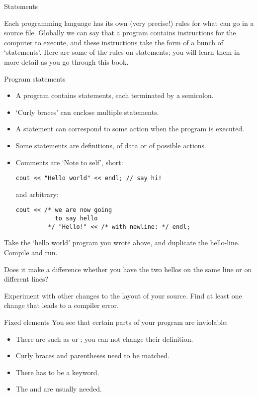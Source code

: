  {Statements}
\label{sec:statements}

Each programming language has its own (very precise!) rules for what
can go in a source file. Globally we can say that a program contains
instructions for the computer to execute, and these instructions take
the form of a bunch of `statements'. Here are some of the rules on
statements; you will learn them in more detail as you go through this
book.

\begin{block}{Program statements}
  \label{sl:cstatement}
  \begin{itemize}
  \item
    A program contains statements, each terminated by a semicolon.
  \item `Curly braces' can enclose multiple statements.
  \item A statement can correspond to some action when the program is
    executed.
  \item Some statements are definitions, of data or of possible actions.
  \item Comments are `Note to self', short:
\begin{verbatim}
cout << "Hello world" << endl; // say hi!
\end{verbatim}
and arbitrary:
\begin{verbatim}
cout << /* we are now going
           to say hello
         */ "Hello!" << /* with newline: */ endl;
\end{verbatim}
  \end{itemize}
\end{block}

\begin{exercise}
  \label{ex:hello-line}
  Take the `hello world' program you wrote above, and duplicate the
  hello-line. Compile and run.

  Does it make a difference whether you have the two hellos on the
  same line or on different lines?

  Experiment with other changes to the layout of your source. Find at
  least one change that leads to a compiler error.
\end{exercise}

\begin{block}{Fixed elements}
  \label{sl:fixedstuff}
  You see that certain parts of your program are inviolable:
  \begin{itemize}
  \item There are  such as  or ; you
    can not change their definition.
  \item Curly braces and parentheses need to be matched.
  \item There has to be a  keyword.
  \item The  and  are usually needed.
  \end{itemize}
\end{block}

